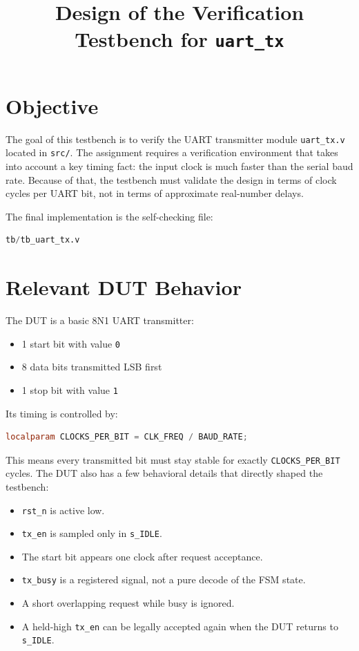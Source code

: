 \documentclass[12pt]{article}
\title{Design of the Verification Testbench for \texttt{uart\_tx}}
\author{}
\date{}
\begin{document}
\maketitle

\section{Objective}

The goal of this testbench is to verify the UART transmitter module
\texttt{uart\_tx.v} located in \texttt{src/}. The assignment requires a
verification environment that takes into account a key timing fact: the input
clock is much faster than the serial baud rate. Because of that, the testbench
must validate the design in terms of clock cycles per UART bit, not in terms of
approximate real-number delays.

The final implementation is the self-checking file:

\begin{lstlisting}[language=Verilog]
tb/tb_uart_tx.v
\end{lstlisting}

\section{Relevant DUT Behavior}

The DUT is a basic 8N1 UART transmitter:

\begin{itemize}
    \item 1 start bit with value \texttt{0}
    \item 8 data bits transmitted LSB first
    \item 1 stop bit with value \texttt{1}
\end{itemize}

Its timing is controlled by:

\begin{lstlisting}[language=Verilog]
localparam CLOCKS_PER_BIT = CLK_FREQ / BAUD_RATE;
\end{lstlisting}

This means every transmitted bit must stay stable for exactly
\texttt{CLOCKS\_PER\_BIT} cycles. The DUT also has a few behavioral details that
directly shaped the testbench:

\begin{itemize}
    \item \texttt{rst\_n} is active low.
    \item \texttt{tx\_en} is sampled only in \texttt{s\_IDLE}.
    \item The start bit appears one clock after request acceptance.
    \item \texttt{tx\_busy} is a registered signal, not a pure decode of the FSM state.
    \item A short overlapping request while busy is ignored.
    \item A held-high \texttt{tx\_en} can be legally accepted again when the DUT returns to \texttt{s\_IDLE}.
\end{itemize}
\end{document}
